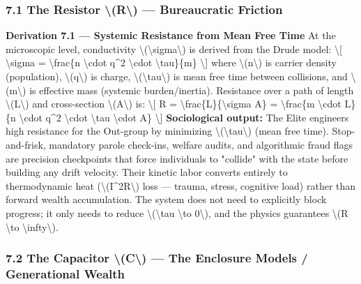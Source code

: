 {\subsubsection{7.1 The Resistor \textbackslash(R\textbackslash) ---
Bureaucratic Friction}\label{the-resistor-r-bureaucratic-friction}

\textbf{Derivation 7.1 --- Systemic Resistance from Mean Free Time} At
the microscopic level, conductivity
\textbackslash(\textbackslash sigma\textbackslash) is derived from the
Drude model: \textbackslash{[} \textbackslash sigma =
\textbackslash frac\{n \textbackslash cdot q\^{}2 \textbackslash cdot
\textbackslash tau\}\{m\} \textbackslash{]} where
\textbackslash(n\textbackslash) is carrier density (population),
\textbackslash(q\textbackslash) is charge,
\textbackslash(\textbackslash tau\textbackslash) is mean free time
between collisions, and \textbackslash(m\textbackslash) is effective
mass (systemic burden/inertia). Resistance over a path of length
\textbackslash(L\textbackslash) and cross-section
\textbackslash(A\textbackslash) is: \textbackslash{[} R =
\textbackslash frac\{L\}\{\textbackslash sigma A\} =
\textbackslash frac\{m \textbackslash cdot L\}\{n \textbackslash cdot
q\^{}2 \textbackslash cdot \textbackslash tau \textbackslash cdot A\}
\textbackslash{]} \textbf{Sociological output:} The Elite engineers high
resistance for the Out-group by minimizing
\textbackslash(\textbackslash tau\textbackslash) (mean free time).
Stop-and-frisk, mandatory parole check-ins, welfare audits, and
algorithmic fraud flags are precision checkpoints that force individuals
to "collide" with the state before building any drift velocity. Their
kinetic labor converts entirely to thermodynamic heat
(\textbackslash(I\^{}2R\textbackslash) loss --- trauma, stress,
cognitive load) rather than forward wealth accumulation. The system does
not need to explicitly block progress; it only needs to reduce
\textbackslash(\textbackslash tau \textbackslash to 0\textbackslash),
and the physics guarantees \textbackslash(R \textbackslash to
\textbackslash infty\textbackslash).

\subsubsection{7.2 The Capacitor \textbackslash(C\textbackslash) --- The
Enclosure Models / Generational
Wealth}\label{the-capacitor-c-the-enclosure-models-generational-wealth}

}
